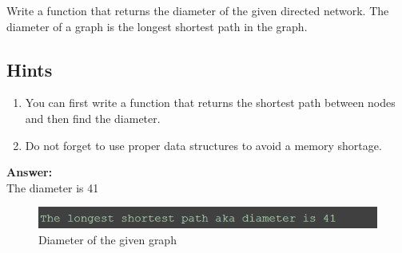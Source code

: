 \documentclass{WeSTassignment}
\begin{document}
Write a function that returns the %
diameter of the given directed network.
The %
diameter of a graph is the longest shortest path in the graph. 


\subsection{Hints}
\begin{enumerate}
\item You can first write a function that returns the shortest path between nodes and then find the %
diameter.
\item Do not forget to use proper data structures to avoid a memory shortage.  
\end{enumerate}

\textbf{Answer:}
\\The diameter is 41

\begin{figure}[h!]
  \centering
  \includegraphics{diameter.png}
   \caption{Diameter of the given graph}
     \label{fig:dig} 
\end{figure}
\end{document}
